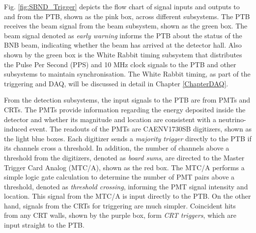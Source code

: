Fig. \ref{fig:SBND_Trigger} depicts the flow chart of signal inputs and outputs to and from the PTB, shown as the pink box, across different subsystems.  
The PTB receives the beam signal from the beam subsystem, shown as the green box.
The beam signal denoted as \textit{early warning} informs the PTB about the status of the BNB beam, indicating whether the beam has arrived at the detector hall.
Also shown by the green box is the White Rabbit timing subsystem that distributes the Pulse Per Second (PPS) and 10 MHz clock signals to the PTB and other subsystems to maintain synchronisation.
The White Rabbit timing, as part of the triggering and DAQ, will be discussed in detail in Chapter \ref{ChapterDAQ}.

From the detection subsystems, the input signals to the PTB are from PMTs and CRTs.                                                                                                         
The PMTs provide information regarding the energy deposited inside the detector and whether its magnitude and location are consistent with a neutrino-induced event.                         
The readouts of the PMTs are CAENV1730SB digitizers, shown as the light blue boxes.                                                                                                         
Each digitizer sends a \textit{majority trigger} directly to the PTB if its channels cross a threshold.                                                                                     
In addition, the number of channels above a threshold from the digitizers, denoted as \textit{board sums}, are directed to the Master Trigger Card Analog (MTC/A), shown as the red box.    
The MTC/A performs a simple logic gate calculation to determine the number of PMT pairs above a threshold, denoted as \textit{threshold crossing}, informing the PMT signal intensity and location.
This signal from the MTC/A is input directly to the PTB.                                                                                                                                    
On the other hand, signals from the CRTs for triggering are much simpler.                                                                                                                   
Coincident hits from any CRT walls, shown by the purple box, form \textit{CRT triggers}, which are input straight to the PTB.                                                               
                                                                                                                                                                                            
